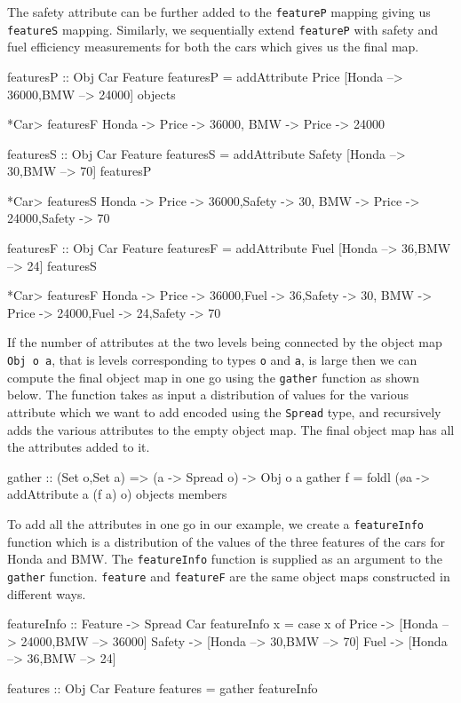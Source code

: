 \documentclass{jfp}
\newcommand{\prog}[1]{\texttt{#1}}
\begin{document}
The safety attribute can be further added to the \prog{featureP} mapping giving us \prog{featureS} mapping. Similarly, we sequentially extend \prog{featureP} with safety and fuel efficiency measurements for both the cars which gives us the final map.
\begin{haskellcode}
featuresP :: Obj Car Feature
featuresP = addAttribute Price [Honda --> 36000,BMW --> 24000] objects

*Car> featuresF
{Honda -> {Price -> 36000},
 BMW -> {Price -> 24000}}

featuresS :: Obj Car Feature
featuresS = addAttribute Safety [Honda --> 30,BMW --> 70] featuresP

*Car> featuresS
{Honda -> {Price -> 36000,Safety -> 30},
 BMW -> {Price -> 24000,Safety -> 70}}

featuresF :: Obj Car Feature
featuresF = addAttribute Fuel [Honda --> 36,BMW --> 24] featuresS

*Car> featuresF
{Honda -> {Price -> 36000,Fuel -> 36,Safety -> 30},
 BMW -> {Price -> 24000,Fuel -> 24,Safety -> 70}}
\end{haskellcode}
If the number of attributes at the two levels being connected by the object map \prog{Obj o a}, that is levels corresponding to types \prog{o} and \prog{a}, is large then we can compute the final object map in one go using the \prog{gather} function as shown below. The function takes as input a distribution of values for the various attribute which we want to add encoded using the \prog{Spread} type, and recursively adds the various attributes to the empty object map. The final object map has all the attributes added to it. 
\begin{haskellcode}
gather :: (Set o,Set a) => (a -> Spread o) -> Obj o a
gather f = foldl (\o a -> addAttribute a (f a) o) objects members
\end{haskellcode}
To add all the attributes in one go in our example, we create a \prog{featureInfo} function which is a distribution of the values of the three features of the cars for Honda and BMW. The \prog{featureInfo} function is supplied as an argument to the \prog{gather} function. \prog{feature} and \prog{featureF} are the same object maps constructed in different ways.
\begin{haskellcode}
featureInfo :: Feature -> Spread Car
featureInfo x 
    = case x of Price -> [Honda --> 24000,BMW --> 36000]
                Safety -> [Honda --> 30,BMW --> 70]
                Fuel   -> [Honda --> 36,BMW --> 24]

features :: Obj Car Feature
features = gather featureInfo
\end{haskellcode}
\end{document}

